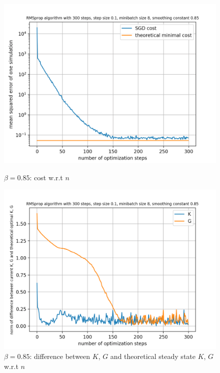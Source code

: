 \documentclass{article}
\begin{document}
\begin{figure}[h!]
	\centering
	\begin{minipage}[t]{.28\paperwidth}
		\centering
		\includegraphics[width=1.0\textwidth]{Figures/beta0_85.png}
		\caption{$\beta = 0.85$: cost w.r.t $n$}
	\end{minipage}%
	\begin{minipage}[t]{.28\paperwidth}
		\centering
		\includegraphics[width=1.0\textwidth]{Figures/d_beta_0_85.png}
		\caption{$\beta = 0.85$: difference between $K$, $G$ and theoretical steady state $K$, $G$ w.r.t $n$}
	\end{minipage}%
	\begin{minipage}[t]{.28\paperwidth}
		\centering

\end{minipage}
\end{figure}
\end{document}
